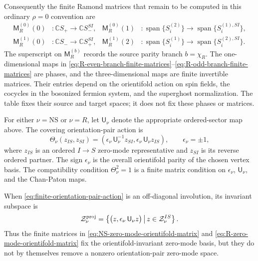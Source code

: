 \documentclass[11pt]{article}
\newcommand{\C}{\mathbb{C}}
\newcommand{\NS}{\mathrm{NS}}
\begin{document}
Consequently the finite Ramond matrices that remain to be computed in this ordinary
\(\rho=0\) convention are
\begin{align}
  \mathsf M_R^{(0)}(0)&:\C S_+\longrightarrow \C S_-^{SI},
  &
  \mathsf M_R^{(0)}(1)&:
  \operatorname{span}\{S_i^{(2)}\}
  \longrightarrow
  \operatorname{span}\{S_i^{(1),SI}\},
  \label{eq:R-even-branch-finite-matrices}
  \\
  \mathsf M_R^{(1)}(0)&:\C S_-\longrightarrow \C S_+^{SI},
  &
  \mathsf M_R^{(1)}(2)&:
  \operatorname{span}\{S_i^{(1)}\}
  \longrightarrow
  \operatorname{span}\{S_i^{(2),SI}\}.
  \label{eq:R-odd-branch-finite-matrices}
\end{align}
The superscript on \(\mathsf M_R^{(b)}\) records the source parity branch \(b=\chi_R\). The
one-dimensional maps in \eqref{eq:R-even-branch-finite-matrices}--\eqref{eq:R-odd-branch-finite-matrices}
are phases, and the three-dimensional maps are finite invertible matrices. Their entries depend
on the orientifold action on spin fields, the cocycles in the bosonized fermion system, and the
superghost normalization. The table fixes their source and target spaces; it does
not fix these phases or matrices.

For either \(\nu=\NS\) or \(\nu=R\), let \(\mathsf U_\nu\) denote the appropriate ordered-sector
map above. The covering orientation-pair action is
\begin{equation}
  \Theta_\nu(z_{IS},z_{SI})
  =
  \left(
    \epsilon_\nu\,\mathsf U_\nu^{-1}z_{SI},
    \epsilon_\nu\,\mathsf U_\nu z_{IS}
  \right),
  \qquad
  \epsilon_\nu=\pm1,
  \label{eq:finite-orientation-pair-action}
\end{equation}
where \(z_{IS}\) is an ordered \(I\to S\) zero-mode representative and \(z_{SI}\) is its reverse
ordered partner. The sign \(\epsilon_\nu\) is the overall orientifold parity of the chosen
vertex basis. The compatibility condition \(\Theta_\nu^2=1\) is a finite matrix condition on
\(\epsilon_\nu\), \(\mathsf U_\nu\), and the Chan-Paton maps.

When \eqref{eq:finite-orientation-pair-action} is an off-diagonal involution, its invariant
subspace is
\begin{equation}
  \mathcal Z_\nu^{\rm proj}
  =
  \left\{
    \bigl(z,\epsilon_\nu\,\mathsf U_\nu z\bigr)
    \,\middle|\,
    z\in \mathcal Z_\nu^{IS}
  \right\}.
  \label{eq:finite-projected-zero-mode-basis}
\end{equation}
Thus the finite matrices in \eqref{eq:NS-zero-mode-orientifold-matrix} and
\eqref{eq:R-zero-mode-orientifold-matrix} fix the orientifold-invariant zero-mode basis, but
they do not by themselves remove a nonzero orientation-pair zero-mode space.
\end{document}
